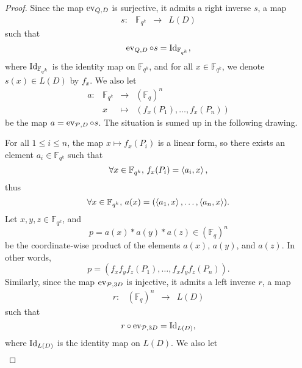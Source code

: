 \documentclass[11pt]{article}
\begin{document}
\begin{proof}
  Since the map $\operatorname{ev}_{Q, D}$ is surjective, it admits a right inverse $s$, \ie a
  map
  \[
        \begin{array}{cccc}
          s: & \mathbb{F}_{q^k} & \to & L(D)
\end{array}
  \]
  such that
  \[
    \operatorname{ev}_{Q, D}\circ s = \operatorname{Id}_{\mathbb{F}_{q^k}},
  \]
  where $\operatorname{Id}_{\mathbb{F}_{q^k}}$ is the identity map on $\mathbb{F}_{q^k}$, and
  for all $x\in\mathbb{F}_{q^k}$, we denote $s(x)\in L(D)$ by $f_x$. We
  also let
  \[
        \begin{array}{cccc}
          a: & \mathbb{F}_{q^k} & \to & (\mathbb{F}_{q})^n \\
          & x & \mapsto & (f_x(P_1), \dots, f_x(P_n))
\end{array}
  \]
  be the map $a = \operatorname{ev}_{\mathcal{P}, D}\circ s$. The situation is sumed up in the
  following drawing.
   \begin{center}
  \end{center}
  For all $1\leq i\leq n$, the map
  $x\mapsto f_x(P_i)$ is a linear form, so there exists an element
  $a_i\in\mathbb{F}_{q^k}$ such that
  \[
    \forall x\in\mathbb{F}_{q^k},\, f_x(P_i) = \left\langle a_i,x\right\rangle,
  \]
  thus
  \[
    \forall x\in\mathbb{F}_{q^k},\, a(x) = (\left\langle a_1,x\right\rangle, \dots, \left\langle a_n,x\right\rangle).
  \]
  Let $x, y, z\in\mathbb{F}_{q^k}$, and
  \[
    p = a(x)*a(y)*a(z)\in(\mathbb{F}_{q})^n
  \]
  be the coordinate-wise product of the elements $a(x)$, $a(y)$, and $a(z)$. In
  other words,
  \[
    p = (f_xf_yf_z(P_1), \dots, f_xf_yf_z(P_n)).
  \]
  Similarly, since the map $\operatorname{ev}_{\mathcal{P}, 3D}$ is injective, it admits a left inverse $r$, \ie a
  map
  \[
        \begin{array}{cccc}
          r: & (\mathbb{F}_{q})^n & \to & L(D)
\end{array}
  \]
  such that
  \[
    r\circ\operatorname{ev}_{\mathcal{P}, 3D} = \operatorname{Id}_{L(D)},
  \]
  where $\operatorname{Id}_{L(D)}$ is the identity map on $L(D)$. We
  also let
  \[
        \begin{array}{cccc}

\end{array}\]
\end{proof}
\end{document}
